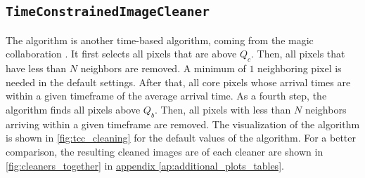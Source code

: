\subsection{\texttt{TimeConstrainedImageCleaner}}
\vspace{-0.5cm}
The \tcc{} algorithm is another time-based algorithm, coming from the \gls{magic} collaboration \cite{tcc}.
It first selects all pixels that are above \(Q_c\). Then, all pixels that have
less than \(N\) neighbors are removed. A minimum of \(\num{1}\) neighboring pixel is needed in the default
settings. After that, all core pixels whose arrival times are within a given timeframe of the average arrival time.
As a fourth step, the \tcc{} algorithm finds all pixels above \(Q_b\). Then, all pixels with
less than \(N\) neighbors arriving within a given timeframe are removed.
The visualization of the algorithm is shown in \autoref{fig:tcc_cleaning} for the default values of the algorithm.
For a better comparison, the resulting cleaned images are of each cleaner are shown in \autoref{fig:cleaners_together}
in \hyperref[ap:additional_plots_tables]{appendix \ref{ap:additional_plots_tables}}.
